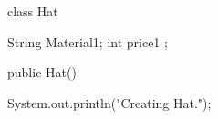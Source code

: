 class Hat{
    
    String Material1;
    int price1 ;

    public Hat() {
        
		System.out.println("Creating Hat.");
    }
}